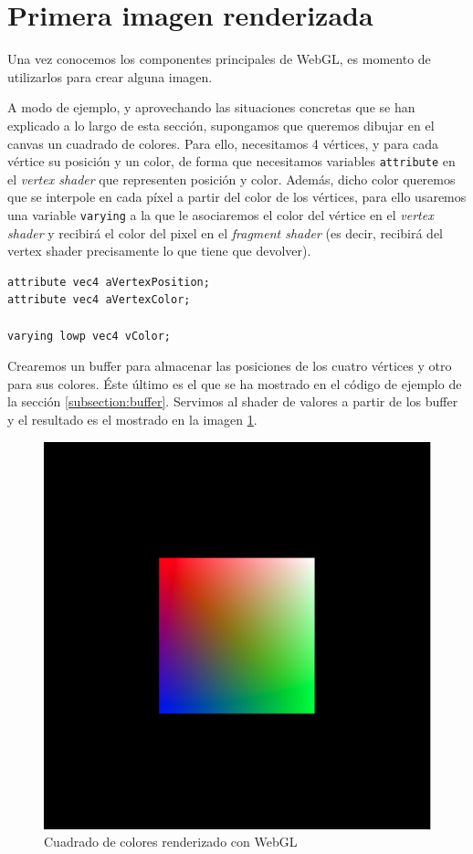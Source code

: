 \section{Primera imagen renderizada}

Una vez conocemos los componentes principales de WebGL, es momento de utilizarlos para crear alguna imagen.

A modo de ejemplo, y aprovechando las situaciones concretas que se han explicado a lo largo de esta sección, supongamos que queremos dibujar en el canvas un cuadrado de colores. Para ello, necesitamos 4 vértices, y para cada vértice su posición y un color, de forma que necesitamos variables \verb|attribute| en el \textit{vertex shader} que representen posición y color. Además, dicho color queremos que se interpole en cada píxel a partir del color de los vértices, para ello usaremos una variable \verb|varying| a la que le asociaremos el color del vértice en el \textit{vertex shader} y recibirá el color del pixel en el \textit{fragment shader} (es decir, recibirá del vertex shader precisamente lo que tiene que devolver).
\begin{lstlisting}
attribute vec4 aVertexPosition;
attribute vec4 aVertexColor;

varying lowp vec4 vColor;
\end{lstlisting}

Crearemos un buffer para almacenar las posiciones de los cuatro vértices y otro para sus colores. Éste último es el que se ha mostrado en el código de ejemplo de la sección \ref{subsection:buffer}. Servimos al shader de valores a partir de los buffer y el resultado es el mostrado en la imagen \ref{fig:ejemplo-wgl}.

\begin{figure} [ht]
    \centering
    \includegraphics[scale = 0.4]{img/C5/ejemplo-shaders.png}
    \caption{Cuadrado de colores renderizado con WebGL}
    \label{fig:ejemplo-wgl}
\end{figure}

